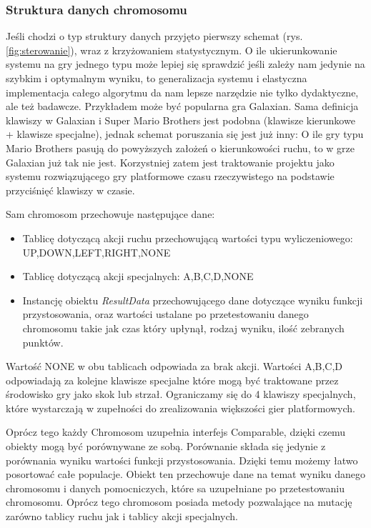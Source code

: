 \subsubsection{Struktura danych chromosomu}
\begin{par}
	Jeśli chodzi o typ struktury danych przyjęto pierwszy schemat (rys.\ref{fig:sterowanie}), wraz z krzyżowaniem statystycznym. 
	O ile ukierunkowanie systemu na gry jednego typu może lepiej się sprawdzić jeśli zależy nam
	jedynie na szybkim i optymalnym wyniku, to generalizacja systemu i elastyczna implementacja całego algorytmu da nam lepsze narzędzie nie tylko dydaktyczne, ale też badawcze.
	Przykładem może być popularna gra Galaxian. Sama definicja klawiszy w Galaxian i Super Mario Brothers jest podobna (klawisze kierunkowe + klawisze specjalne),
	jednak schemat poruszania się jest już inny: O ile gry typu Mario Brothers pasują do powyższych założeń o kierunkowości ruchu, to w grze Galaxian już tak nie jest.
	Korzystniej zatem jest traktowanie projektu jako systemu rozwiązującego gry platformowe czasu rzeczywistego na podstawie przyciśnięć klawiszy w czasie.
\end{par}
\begin{par}
	
	Sam chromosom przechowuje następujące dane:

	\begin{itemize}
		\item Tablicę dotyczącą akcji ruchu przechowującą wartości typu wyliczeniowego: UP,DOWN,LEFT,RIGHT,NONE
		\item Tablicę dotyczącą akcji specjalnych: A,B,C,D,NONE
		\item Instancję obiektu \textit{ResultData} przechowującego dane dotyczące wyniku funkcji przystosowania, oraz wartości ustalane po przetestowaniu danego chromosomu takie jak czas który upłynął, rodzaj wyniku, ilość zebranych punktów.
	\end{itemize}

	Wartość NONE w obu tablicach odpowiada za brak akcji. 
	Wartości A,B,C,D odpowiadają za kolejne klawisze specjalne które mogą być traktowane przez środowisko gry jako skok lub strzał. 
	Ograniczamy się do 4 klawiszy specjalnych, które wystarczają w zupełności do zrealizowania większości gier platformowych.

	Oprócz tego każdy Chromosom uzupełnia interfejs Comparable, dzięki czemu obiekty mogą być porównywane ze sobą. Porównanie składa się jedynie z porównania wyniku wartości funkcji przystosowania. Dzięki temu możemy łatwo posortować całe populacje.
	Obiekt ten przechowuje dane na temat wyniku danego chromosomu i danych pomocniczych, które sa uzupełniane po przetestowaniu chromosomu. 
	Oprócz tego chromosom posiada metody pozwalające na mutację zarówno tablicy ruchu jak i tablicy akcji specjalnych.
\end{par}
